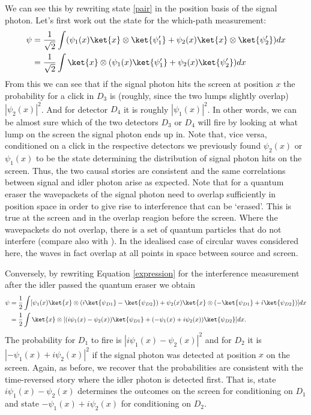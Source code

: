 \documentclass[12pt]{article}
\numberwithin{equation}{section}
\begin{document}
We can see this by rewriting state \ref{pair} in the position basis of the signal photon. Let's first work out the state for the which-path measurement:
\begin{align}
\psi&=\frac{1}{\sqrt{2}}\int(\psi_1(x)\ket{x}\otimes \ket{\psi_1'}+\psi_2(x)\ket{x}\otimes \ket{\psi_2'})dx\\ \nonumber
&= \frac{1}{\sqrt{2}}\int\ket{x}\otimes(\psi_1(x) \ket{\psi_1'}+\psi_2(x)\ket{\psi_2'})dx
\end{align}
From this we can see that if the signal photon hits the screen at position $x$ the probability for a click in $D_3$ is (roughly, since the two lumps slightly overlap) $|\psi_2(x)|^2$. And for detector $D_4$ it is roughly $|\psi_1(x)|^2$.  In other words, we can be almost sure which of the two detectors $D_3$ or $D_4$ will fire by looking at what lump on the screen the signal photon ends up in. Note that, vice versa, conditioned on a click in the respective detectors we previously found  $\psi_2(x)$ or $\psi_1(x)$ to be the state determining the distribution of signal photon hits on the screen. Thus, the two causal stories are consistent and the same correlations between signal and idler photon arise as expected. Note that for a quantum eraser the wavepackets of the signal photon need to overlap sufficiently in position space in order to give rise to interference that can be `erased'. This is true at the screen and in the overlap reagion before the screen. Where the wavepackets do not overlap, there is a set of quantum particles that do not interfere (compare also with \cite{Quanta87}). In the idealised case of circular waves considered here, the waves in fact overlap at all points in space between source and screen. 

Conversely, by rewriting Equation \ref{expression} for the interference measurement after the idler passed the quantum eraser we obtain
\begin{align}
\psi &= \frac{1}{2}\int[\psi_1(x)\ket{x}\otimes (i\ket{\psi_{D1}}-\ket{\psi_{D2}})+\psi_2(x)\ket{x}\otimes (-\ket{\psi_{D1}}+i\ket{\psi_{D2}})]dx \nonumber \\ &=\frac{1}{2}\int\ket{x}\otimes[(i\psi_1(x)-\psi_{2}(x))\ket{\psi_{D1}}+(-\psi_{1}(x)+i\psi_{2}(x))\ket{\psi_{D2}}]dx.
\end{align} The probability for $D_1$ to fire is $|i\psi_1(x)-\psi_{2}(x)|^2$ and for $D_2$ it is $|-\psi_1(x)+i\psi_{2}(x)|^2$ if the signal photon was detected at position $x$ on the screen. Again, as before, we recover that the probabilities are consistent with the time-reversed story where the idler photon is detected first. That is, state $i\psi_1(x)-\psi_{2}(x)$ determines the outcomes on the screen for conditioning on $D_1$ and state $-\psi_1(x)+i\psi_{2}(x)$ for conditioning on $D_2$.
\end{document}
